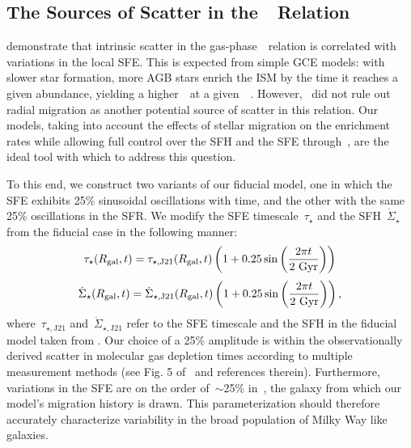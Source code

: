 \documentclass[ms.tex]{subfiles}
\begin{document}
\subsection{The Sources of Scatter in the~\ohno~Relation}
\label{sec:results:schaefer_comp}

\citet{Schaefer2020} demonstrate that intrinsic scatter in the
gas-phase~\ohno~relation is correlated with variations in the local SFE.
This is expected from simple GCE models: with slower star formation, more AGB
stars enrich the ISM by the time it reaches a given abundance, yielding a
higher~\no~at a given~\oh~\citep[e.g.][]{Molla2006, Vincenzo2016a}.
However,~\citet{Schaefer2020} did not rule out radial migration as another
potential source of scatter in this relation.
Our models, taking into account the effects of stellar migration on the
enrichment rates while allowing full control over the SFH and the SFE
through~\vice, are the ideal tool with which to address this question.
\par
To this end, we construct two variants of our fiducial model, one in which the
SFE exhibits 25\% sinusoidal oscillations with time, and the other with the
same 25\% oscillations in the SFR.
We modify the SFE timescale~$\tau_\star$ and the SFH~$\dot{\Sigma}_\star$ from
the fiducial case in the following manner:
\begin{equation}
\tau_\star(R_\text{gal}, t) = \tau_{\star,\text{J21}}(R_\text{gal}, t)
\left(1 + 0.25\sin\left(\frac{2\pi t}{2~\text{Gyr}}\right)\right)
\label{eq:sfe_var}
\end{equation}
\begin{equation}
\dot{\Sigma}_\star(R_\text{gal}, t) = \dot{\Sigma}_{\star,\text{J21}}(R_\text{gal}, t)
\left(1 + 0.25\sin\left(\frac{2\pi t}{2~\text{Gyr}}\right)\right),
\label{eq:sfr_var}
\end{equation}
where~$\tau_{\star,\text{J21}}$ and~$\dot{\Sigma}_{\star,\text{J21}}$ refer to
the SFE timescale and the SFH in the fiducial model taken from
\citet{Johnson2021}.
Our choice of a 25\% amplitude is within the observationally derived scatter in
molecular gas depletion times according to multiple measurement methods (see
Fig. 5 of~\citealp{Tacconi2018} and references therein).
Furthermore, variations in the SFE are on the order of~$\sim$25\% in~\hsim,
the galaxy from which our model's migration history is drawn.
This parameterization should therefore accurately characterize variability
in the broad population of Milky Way like galaxies.
\end{document}

